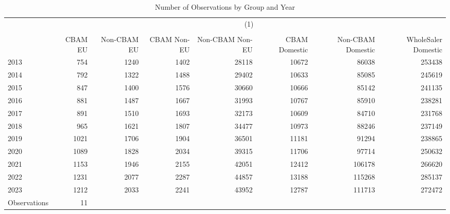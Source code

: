 \begin{table}[htbp] \centering \caption{Number of Observations by Group and Year} \label{tab:Nvalues} \scriptsize \begin{tabular}{l*{7}{r}} \toprule
                    &\multicolumn{7}{c}{(1)}                                                                   \\
                    &\multicolumn{7}{c}{}                                                                      \\
                    &     CBAM EU& Non-CBAM EU& CBAM Non-EU&Non-CBAM Non-EU&CBAM Domestic&Non-CBAM Domestic&WholeSaler Domestic\\
\midrule
2013                &         754&        1240&        1402&       28118&       10672&       86038&      253438\\
2014                &         792&        1322&        1488&       29402&       10633&       85085&      245619\\
2015                &         847&        1400&        1576&       30660&       10666&       85142&      241135\\
2016                &         881&        1487&        1667&       31993&       10767&       85910&      238281\\
2017                &         891&        1510&        1693&       32173&       10609&       84710&      231768\\
2018                &         965&        1621&        1807&       34477&       10973&       88246&      237149\\
2019                &        1021&        1706&        1904&       36501&       11181&       91294&      238865\\
2020                &        1089&        1828&        2034&       39315&       11706&       97714&      250632\\
2021                &        1153&        1946&        2155&       42051&       12412&      106178&      266620\\
2022                &        1231&        2077&        2287&       44857&       13188&      115268&      285137\\
2023                &        1212&        2033&        2241&       43952&       12787&      111713&      272472\\
\midrule
Observations        &          11&            &            &            &            &            &            \\
\bottomrule \end{tabular} \end{table}
